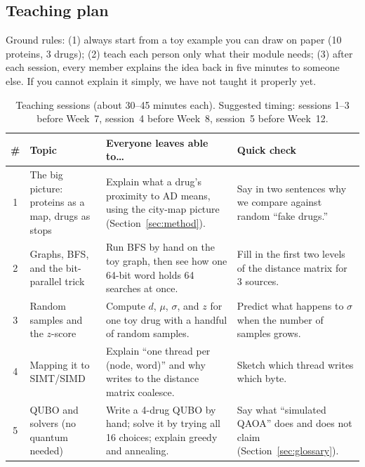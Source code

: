 \subsection{Teaching plan}
\label{sec:teaching}

\begin{plain}
Ground rules: (1) always start from a toy example you can draw on paper (10
proteins, 3 drugs); (2) teach each person only what their module needs;
(3) after each session, every member explains the idea back in five minutes
to someone else. If you cannot explain it simply, we have not taught it
properly yet.
\end{plain}

\begin{table}[!ht]
\centering
\small
\begin{tabularx}{\linewidth}{@{}c>{\raggedright\arraybackslash}p{3.0cm}>{\raggedright\arraybackslash}X>{\raggedright\arraybackslash}X@{}}
\toprule
\# & Topic & Everyone leaves able to\dots & Quick check \\
\midrule
1 & The big picture: proteins as a map, drugs as stops & Explain what a drug's proximity to AD means, using the city-map picture (Section~\ref{sec:method}). & Say in two sentences why we compare against random ``fake drugs.'' \\
2 & Graphs, BFS, and the bit-parallel trick & Run BFS by hand on the toy graph, then see how one 64-bit word holds 64 searches at once. & Fill in the first two levels of the distance matrix for 3 sources. \\
3 & Random samples and the $z$-score & Compute $d$, $\mu$, $\sigma$, and $z$ for one toy drug with a handful of random samples. & Predict what happens to $\sigma$ when the number of samples grows. \\
4 & Mapping it to SIMT/SIMD & Explain ``one thread per (node, word)'' and why writes to the distance matrix coalesce. & Sketch which thread writes which byte. \\
5 & QUBO and solvers (no quantum needed) & Write a 4-drug QUBO by hand; solve it by trying all 16 choices; explain greedy and annealing. & Say what ``simulated QAOA'' does and does not claim (Section~\ref{sec:glossary}). \\
\bottomrule
\end{tabularx}
\caption{Teaching sessions (about 30--45 minutes each). Suggested timing:
sessions 1--3 before Week~7, session~4 before Week~8, session~5 before
Week~12. }
\label{tab:teaching}
\end{table}

